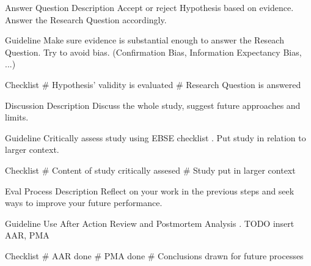 Answer Question
	Description
		Accept or reject Hypothesis based on evidence.
		Answer the Research Question accordingly.
	
	Guideline
		Make sure evidence is substantial enough to answer the Reseach Question.
		Try to avoid bias. (Confirmation Bias, Information Expectancy Bias, ...)
		
	Checklist
		\# Hypothesis' validity is evaluated
		\# Research Question is answered
	
	
Discussion
	Description
		Discuss the whole study, suggest future approaches and limits.
		
	Guideline
		Critically assess study using EBSE checklist \cite[p. 62]{Dyba2005}.
		Put study in relation to larger context.

	Checklist
		\# Content of study critically assesed
		\# Study put in larger context



Eval Process
	Description
		Reflect on your work in the previous steps and seek ways to improve your
		future performance.
		
	Guideline	
		Use After Action Review and Postmortem Analysis \cite{Dyba2005}.
		TODO insert AAR, PMA
		
	Checklist	
		\# AAR done
		\# PMA done
		\# Conclusions drawn for future processes
	
	
	
	
	